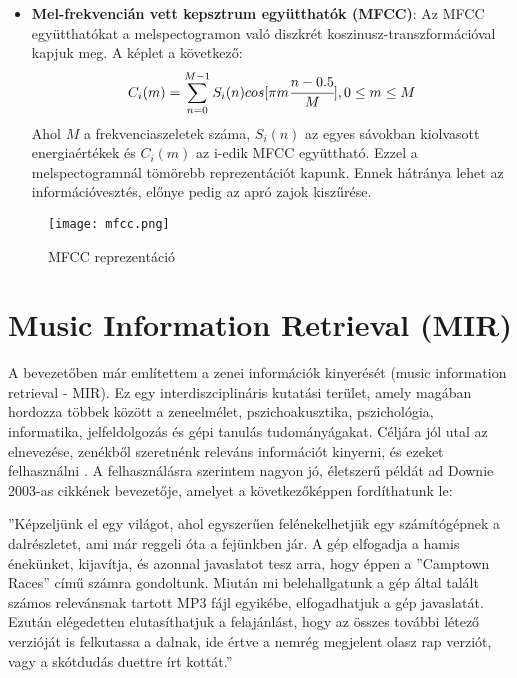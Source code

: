 \begin{itemize}
\item \textbf{Mel-frekvencián vett kepsztrum együtthatók (MFCC)}: Az MFCC együtthatókat a melspectogramon való diszkrét koszinusz-transzformációval kapjuk meg. A képlet a következő:
\begin{equation}
	C_i(m) =  \sum_{n=0}^{M-1}S_i(n) cos [\pi m\cfrac{n - 0.5}{M}], 0 \leq m \leq M
\end{equation}
Ahol \(M\) a frekvenciaszeletek száma, \(S_i(n)\) az egyes sávokban kiolvasott energiaértékek és \(C_i(m)\) az i-edik MFCC együttható. Ezzel a melspectogramnál tömörebb reprezentációt kapunk. Ennek hátránya lehet az információvesztés, előnye pedig az apró zajok kiszűrése. \cite{bhalke2015}
\end{itemize}

\begin{figure}[H]
  \centering
  \texttt{[image: mfcc.png]}
  \caption{MFCC reprezentáció \cite{librosa}}
\end{figure}

\section{Music Information Retrieval (MIR)} 

A bevezetőben már említettem a zenei információk kinyerését (music information retrieval - MIR). Ez egy interdiszciplináris kutatási terület, amely magában hordozza többek között a zeneelmélet, pszichoakusztika, pszichológia, informatika, jelfeldolgozás és gépi tanulás tudományágakat. Céljára jól utal az elnevezése, zenékből szeretnénk releváns információt kinyerni, és ezeket felhasználni \cite{Choi2017}. A felhasználásra szerintem nagyon jó, életszerű példát ad Downie 2003-as cikkének \cite{Downie2003} bevezetője, amelyet a következőképpen fordíthatunk le:

''Képzeljünk el egy világot, ahol egyszerűen felénekelhetjük egy számítógépnek a dalrészletet, ami már reggeli óta a fejünkben jár. A gép elfogadja a hamis énekünket, kijavítja, és azonnal javaslatot tesz arra, hogy éppen a ''Camptown Races'' című számra gondoltunk. Miután mi belehallgatunk a gép által talált számos relevánsnak tartott MP3 fájl egyikébe, elfogadhatjuk a gép javaslatát. Ezután elégedetten elutasíthatjuk a felajánlást, hogy az összes további létező verzióját is felkutassa a dalnak, ide értve a nemrég megjelent olasz rap verziót, vagy a skótdudás duettre írt kottát.''  \cite{Downie2003}

